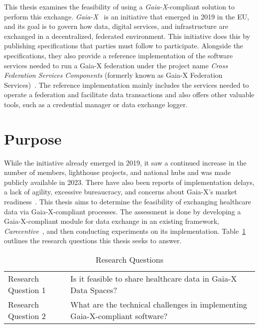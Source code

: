 This thesis examines the feasibility of using a \textit{Gaia-X}-compliant solution to perform this exchange.
\textit{Gaia-X}~\cite{gaiax} is an initiative that emerged in 2019 in the EU, and its goal is to govern how data, digital services, and infrastructure are exchanged in a decentralized, federated environment.
This initiative does this by publishing specifications that parties must follow to participate.
Alongside the specifications, they also provide a reference implementation of the software services needed to run a Gaia-X federation under the project name \textit{Cross Federation Services Components} (formerly known as Gaia-X Federation Services)~\cite{gxfs}.
The reference implementation mainly includes the services needed to operate a federation and facilitate data transactions and also offers other valuable tools, such as a credential manager or data exchange logger.

\section{Purpose}\label{sec:purpose}

While the initiative already emerged in 2019, it saw a continued increase in the number of members, lighthouse projects, and national hubs and was made publicly available in 2023.
There have also been reports of implementation delays, a lack of agility, excessive bureaucracy, and concerns about Gaia-X's market readiness~\cite{say_gaia-x_2024, noauthor_inside_2021, eichberger_why_2021}.
This thesis aims to determine the feasibility of exchanging healthcare data via Gaia-X-compliant processes.
The assessment is done by developing a Gaia-X-compliant module for data exchange in an existing framework, \textit{Carecentive}~\cite{carecentive}, and then conducting experiments on its implementation.
Table~\ref{tab:research-questions} outlines the research questions this thesis seeks to answer.

\begin{table}
    \centering
    {\renewcommand{\arraystretch}{1.7}
        \begin{tabular}{ p{4cm}|p{11cm} }
            Research Question 1 & Is it feasible to share healthcare data in Gaia-X Data Spaces?\\
            \hhline{--}
            Research Question 2 & What are the technical challenges in implementing Gaia-X-compliant software?
        \end{tabular}
    }
    \caption{Research Questions}
    \label{tab:research-questions}
\end{table}

